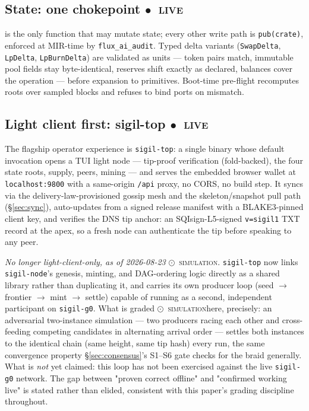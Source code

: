\documentclass[10pt,a4paper]{article}
\newcommand{\stS}{\textcolor{sigilblue}{$\odot$}~{\scriptsize\textcolor{sigilblue}{\textsc{simulation}}}}
\newcommand{\stL}{\textcolor{sigilcyan}{$\bullet$}~{\scriptsize\textcolor{sigilcyan}{\textsc{live}}}}
\begin{document}
\subsection{State: one chokepoint \hfill \stL}

 is the only function that may mutate state;
every other write path is \texttt{pub(crate)}, enforced at MIR-time by
\texttt{flux\_ai\_audit}. Typed delta variants (\texttt{SwapDelta}, \texttt{LpDelta},
\texttt{LpBurnDelta}) are validated as units — token pairs match, immutable pool fields
stay byte-identical, reserves shift exactly as declared, balances cover the operation —
before expansion to primitives. Boot-time pre-flight recomputes roots over sampled
blocks and refuses to bind ports on mismatch.

\subsection{Light client first: sigil-top \hfill \stL}

The flagship operator experience is \texttt{sigil-top}: a single binary whose default
invocation opens a TUI light node — tip-proof verification (fold-backed), the four
state roots, supply, peers, mining — and serves the embedded browser wallet at
\texttt{localhost:9800} with a same-origin \texttt{/api} proxy, no CORS, no build step.
It syncs via the delivery-law-provisioned gossip mesh and the skeleton/snapshot pull
path (\S\ref{sec:sync}), auto-updates from a signed release manifest with a
BLAKE3-pinned client key, and verifies the DNS tip anchor: an SQIsign-L5-signed
\texttt{v=sigil1} TXT record at the apex, so a fresh node can authenticate the tip
before speaking to any peer.

\emph{No longer light-client-only, as of 2026-08-23} \hfill \stS. \texttt{sigil-top} now
links \texttt{sigil-node}'s genesis, minting, and DAG-ordering logic directly as a shared
library rather than duplicating it, and carries its own producer loop (seed
$\to$ frontier $\to$ mint $\to$ settle) capable of running as a second, independent
participant on \texttt{sigil-g0}. What is graded \stS here, precisely: an
adversarial two-instance simulation — two producers racing each other and cross-feeding
competing candidates in alternating arrival order — settles both instances to the
identical chain (same height, same tip hash) every run, the same convergence property
\S\ref{sec:consensus}'s S1--S6 gate checks for the braid generally. What is \emph{not}
yet claimed: this loop has not been exercised against the live \texttt{sigil-g0} network.
The gap between "proven correct offline" and "confirmed working live" is stated rather
than elided, consistent with this paper's grading discipline throughout.
\end{document}
